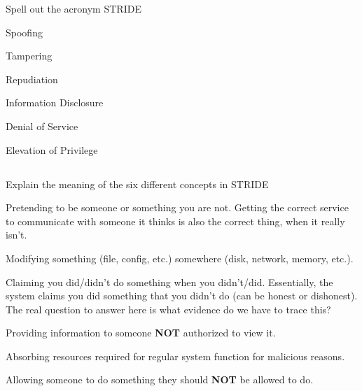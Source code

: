\begin{questions}
\question{} Spell out the acronym STRIDE
  \begin{solution}
    \begin{description}[noitemsep]
    \item[S] Spoofing
    \item[T] Tampering
    \item[R] Repudiation
    \item[I] Information Disclosure
    \item[D] Denial of Service
    \item[E] Elevation of Privilege
    \end{description}
  \end{solution}

  \begin{parts}
  \part{} Explain the meaning of the six different concepts in STRIDE
    \begin{solution}
      \begin{description}[noitemsep]
      \item[Spoofing] Pretending to be someone or something you are not.
        Getting the correct service to communicate with someone it thinks is also the correct thing, when it really isn't.
      \item[Tampering] Modifying something (file, config, etc.) somewhere (disk, network, memory, etc.).
      \item[Repudiation] Claiming you did/didn't do something when you didn't/did.
        Essentially, the system claims you did something that you didn't do (can be honest or dishonest).
        The real question to answer here is what evidence do we have to trace this?
      \item[Information Disclosure] Providing information to someone \textbf{NOT} authorized to view it.
      \item[Denial of Service] Absorbing resources required for regular system function for malicious reasons.
      \item[Elevation of Privilege] Allowing someone to do something they should \textbf{NOT} be allowed to do.
      \end{description}
    \end{solution}


\end{parts}
\end{questions}
